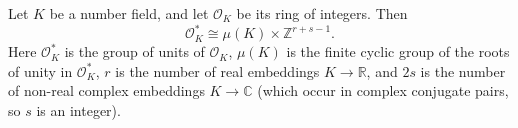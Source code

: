 \documentclass[12pt]{article}
\begin{document}

Let $K$ be a number field, and let $\mathcal{O}_K$ be its ring of integers.
Then
\[
  \mathcal{O}_K^*\cong \mu(K)\times\mathbb{Z}^{r+s-1}.
\]
Here $\mathcal{O}_K^*$ is the group of units of $\mathcal{O}_K$,
$\mu(K)$ is the finite cyclic group of the roots of unity in $\mathcal{O}_K^*$,
$r$ is the number of real embeddings $K\rightarrow \mathbb{R}$,
and $2s$ is the number of non-real complex embeddings $K\rightarrow \mathbb{C}$ (which occur in complex conjugate pairs, so $s$ is an integer).
\end{document}
